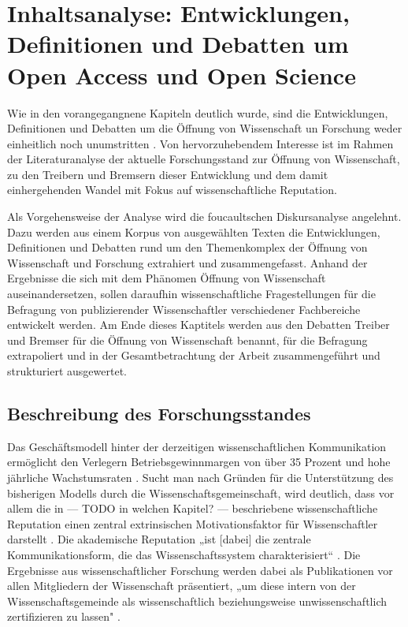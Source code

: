 \chapter{Inhaltsanalyse: Entwicklungen, Definitionen und Debatten um Open Access und Open Science}
Wie in den vorangegangnene Kapiteln deutlich wurde, sind die Entwicklungen, Definitionen und Debatten um die Öffnung von Wissenschaft un Forschung weder einheitlich noch unumstritten \cite{muller_2010_open} \cite{schulze_2013_open}. Von hervorzuhebendem Interesse ist im Rahmen der Literaturanalyse der aktuelle Forschungsstand zur Öffnung von Wissenschaft, zu den Treibern und Bremsern dieser Entwicklung und dem damit einhergehenden Wandel mit Fokus auf wissenschaftliche Reputation. 

Als Vorgehensweise der Analyse wird die foucaultschen Diskursanalyse angelehnt. Dazu werden aus einem Korpus von ausgewählten Texten die Entwicklungen, Definitionen und Debatten rund um den Themenkomplex der Öffnung von Wissenschaft und Forschung extrahiert und zusammengefasst. Anhand der Ergebnisse die sich mit dem Phänomen Öffnung von Wissenschaft auseinandersetzen, sollen daraufhin wissenschaftliche Fragestellungen für die Befragung von publizierender Wissenschaftler verschiedener Fachbereiche entwickelt werden. Am Ende dieses Kaptitels werden aus den Debatten Treiber und Bremser für die Öffnung von Wissenschaft benannt, für die Befragung extrapoliert und in der Gesamtbetrachtung der Arbeit zusammengeführt und strukturiert ausgewertet.

\section{Beschreibung des Forschungsstandes}
Das Geschäftsmodell hinter der derzeitigen wissenschaftlichen Kommunikation ermöglicht den Verlegern Betriebsgewinnmargen von über 35 Prozent \cite{russell_2008_business} und hohe jährliche Wachstumsraten \cite{Wellcome_Trust_2003}. Sucht man nach Gründen für die Unterstützung des bisherigen Modells durch die Wissenschaftsgemeinschaft, wird deutlich, dass vor allem die in --- TODO in welchen Kapitel? --- beschriebene wissenschaftliche Reputation einen zentral extrinsischen Motivationsfaktor für Wissenschaftler darstellt \cite{minssen_2012_arbeit}. Die akademische Reputation „ist [dabei] die zentrale Kommunikationsform, die das Wissenschaftssystem charakterisiert“ \cite{Rutenfranz_1997}. Die Ergebnisse aus wissenschaftlicher Forschung werden dabei als Publikationen vor allen Mitgliedern der Wissenschaft präsentiert, „um diese intern von der Wissenschaftsgemeinde als wissenschaftlich beziehungsweise unwissenschaftlich zertifizieren zu lassen" \cite{Rutenfranz_1997}.

